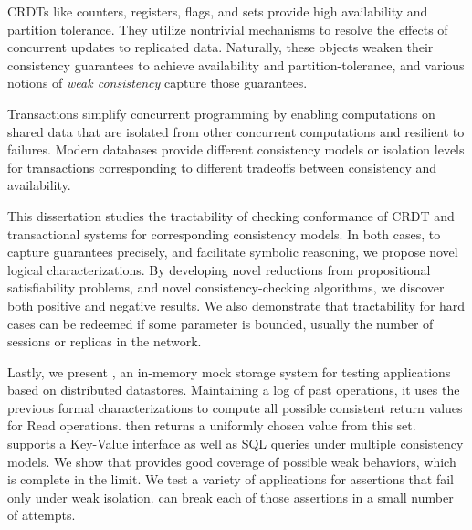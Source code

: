 CRDTs like counters, registers, flags, and sets provide high availability and partition tolerance. They utilize nontrivial mechanisms to resolve the effects of concurrent updates to replicated data. Naturally, these objects weaken their consistency guarantees to achieve availability and partition-tolerance, and various notions of \emph{weak consistency} capture those guarantees.

Transactions simplify concurrent programming by enabling computations on shared data that are isolated from other concurrent computations and resilient to failures. Modern databases provide different consistency models or isolation levels for transactions corresponding to different tradeoffs between consistency and availability.

This dissertation studies the tractability of checking conformance of CRDT and transactional systems for corresponding consistency models. In both cases, to capture guarantees precisely, and facilitate symbolic reasoning, we propose novel logical characterizations. By developing novel reductions from propositional satisfiability problems, and novel consistency-checking algorithms, we discover both positive and negative results. We also demonstrate that tractability for hard cases can be redeemed if some parameter is bounded, usually the number of sessions or replicas in the network.

Lastly, we present \tool{}, an in-memory mock storage system for testing applications based on distributed datastores. Maintaining a log of past operations, it uses the previous formal characterizations to compute all possible consistent return values for \textrm{Read} operations. \tool{} then returns a uniformly chosen value from this set. \tool{} supports a Key-Value interface as well as SQL queries under multiple consistency models. We show that \tool{} provides good coverage of possible weak behaviors, which is complete in the limit. We test a variety of applications for assertions that fail only under weak isolation. \tool{} can break each of those assertions in a small number of attempts. 